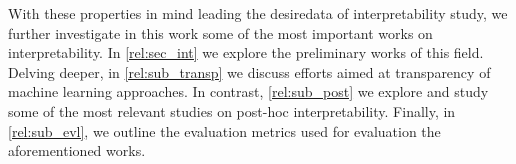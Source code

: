 With these properties in mind leading the desiredata of interpretability study, we further 
investigate in this work some of the most important works on interpretability. In 
\autoref{rel:sec_int} we explore the preliminary works of this field. Delving deeper, in 
\autoref{rel:sub_transp} we discuss efforts aimed at transparency of machine learning approaches. 
In contrast, \autoref{rel:sub_post} we explore and study 
some of the most relevant studies on post-hoc interpretability. Finally, in \autoref{rel:sub_evl}, 
we outline the evaluation metrics used for evaluation the aforementioned works.

\newpage

\newpage
